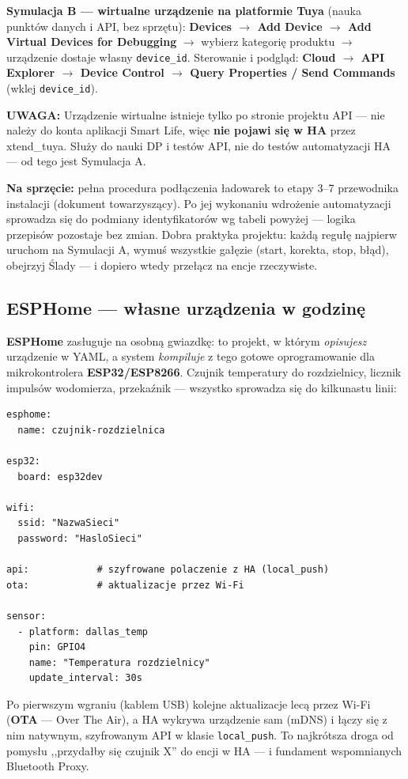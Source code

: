 \documentclass[11pt,a4paper]{article}
\newcommand{\uwaga}[1]{\par\medskip\noindent\textcolor{warnred}{\textbf{UWAGA:}} #1\par\medskip}
\begin{document}
\textbf{Symulacja B --- wirtualne urządzenie na platformie Tuya} (nauka punktów danych i API, bez sprzętu): \textbf{Devices $\to$ Add Device $\to$ Add Virtual Devices for Debugging} $\to$ wybierz kategorię produktu $\to$ urządzenie dostaje własny \texttt{device\_id}. Sterowanie i podgląd: \textbf{Cloud $\to$ API Explorer $\to$ Device Control $\to$ Query Properties / Send Commands} (wklej \texttt{device\_id}). \uwaga{Urządzenie wirtualne istnieje tylko po stronie projektu API --- nie należy do konta aplikacji Smart Life, więc \textbf{nie pojawi się w HA} przez xtend\_tuya. Służy do nauki DP i testów API, nie do testów automatyzacji HA --- od tego jest Symulacja A.}

\textbf{Na sprzęcie:} pełna procedura podłączenia ładowarek to etapy 3--7 przewodnika instalacji (dokument towarzyszący). Po jej wykonaniu wdrożenie automatyzacji sprowadza się do podmiany identyfikatorów wg tabeli powyżej --- logika przepisów pozostaje bez zmian. Dobra praktyka projektu: każdą regułę najpierw uruchom na Symulacji A, wymuś wszystkie gałęzie (start, korekta, stop, błąd), obejrzyj Ślady --- i dopiero wtedy przełącz na encje rzeczywiste.

\subsection{ESPHome --- własne urządzenia w godzinę}
\label{sec:esphome}

\textbf{ESPHome} zasługuje na osobną gwiazdkę: to projekt, w którym \emph{opisujesz} urządzenie w YAML, a system \emph{kompiluje} z tego gotowe oprogramowanie dla mikrokontrolera \textbf{ESP32/ESP8266}. Czujnik temperatury do rozdzielnicy, licznik impulsów wodomierza, przekaźnik --- wszystko sprowadza się do kilkunastu linii:

\begin{lstlisting}
esphome:
  name: czujnik-rozdzielnica

esp32:
  board: esp32dev

wifi:
  ssid: "NazwaSieci"
  password: "HasloSieci"

api:            # szyfrowane polaczenie z HA (local_push)
ota:            # aktualizacje przez Wi-Fi

sensor:
  - platform: dallas_temp
    pin: GPIO4
    name: "Temperatura rozdzielnicy"
    update_interval: 30s
\end{lstlisting}

Po pierwszym wgraniu (kablem USB) kolejne aktualizacje lecą przez Wi-Fi (\textbf{OTA} --- Over The Air), a HA wykrywa urządzenie sam (mDNS) i łączy się z nim natywnym, szyfrowanym API w klasie \texttt{local\_push}. To najkrótsza droga od pomysłu ,,przydałby się czujnik X'' do encji w HA --- i fundament wspomnianych Bluetooth Proxy. 
\end{document}

